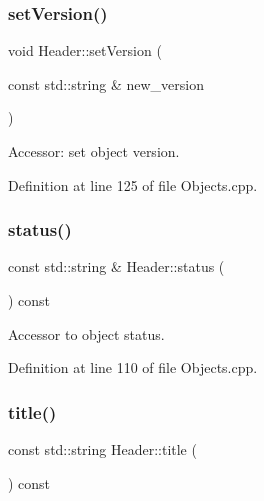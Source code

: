 \subsubsection{\texorpdfstring{set\+Version()}{setVersion()}}
{\footnotesize\ttfamily void Header\+::set\+Version (\begin{DoxyParamCaption}\item[{const std\+::string \&}]{new\+\_\+version }\end{DoxyParamCaption})}



Accessor\+: set object version. 



Definition at line 125 of file Objects.\+cpp.

\hypertarget{class_d_d4hep_1_1_geometry_1_1_header_ad06eb4b3d641ee21cc1d0fe00f65d067}{}\label{class_d_d4hep_1_1_geometry_1_1_header_ad06eb4b3d641ee21cc1d0fe00f65d067} 
\subsubsection{\texorpdfstring{status()}{status()}}
{\footnotesize\ttfamily const std\+::string \& Header\+::status (\begin{DoxyParamCaption}{ }\end{DoxyParamCaption}) const}



Accessor to object status. 



Definition at line 110 of file Objects.\+cpp.

\hypertarget{class_d_d4hep_1_1_geometry_1_1_header_a3d7080213e2473958f795a86df89a06c}{}\label{class_d_d4hep_1_1_geometry_1_1_header_a3d7080213e2473958f795a86df89a06c} 
\subsubsection{\texorpdfstring{title()}{title()}}
{\footnotesize\ttfamily const std\+::string Header\+::title (\begin{DoxyParamCaption}{ }\end{DoxyParamCaption}) const}



